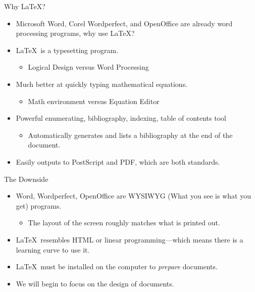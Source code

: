 \documentclass[pdf]{prosper}
\begin{document}
\begin{slide}{Why \LaTeX?}
	\begin{itemize}
		\item Microsoft Word, Corel Wordperfect, and OpenOffice are already word processing programs, why use \LaTeX?
		\item \LaTeX\ is a typesetting program.
			\begin{itemize}
				\item Logical Design versus Word Processing
			\end{itemize}
		\item Much better at quickly typing mathematical equations.			
			\begin{itemize}
				\item Math environment versus Equation Editor
			\end{itemize}
		\item Powerful enumerating, bibliography, indexing, table of contents tool
			\begin{itemize}
				\item Automatically generates and lists a bibliography at the end of the document.
			\end{itemize}
		\item Easily outputs to PostScript and PDF, which are both standards.
	\end {itemize}
\end{slide}
\begin{slide}{The Downside}
	\begin{itemize}
		\item Word, Wordperfect, OpenOffice are WYSIWYG (What you see is what you get) programs.
			\begin{itemize}
				\item The layout of the screen roughly matches what is printed out.
			\end{itemize}
		\item \LaTeX\ resembles HTML or linear programming---which means there is a learning curve to use it.
		\item \LaTeX\ must be installed on the computer to \textit{prepare} documents.
		\item We will begin to focus on the design of documents.
	\end{itemize}
\end{slide}
\end{document}
